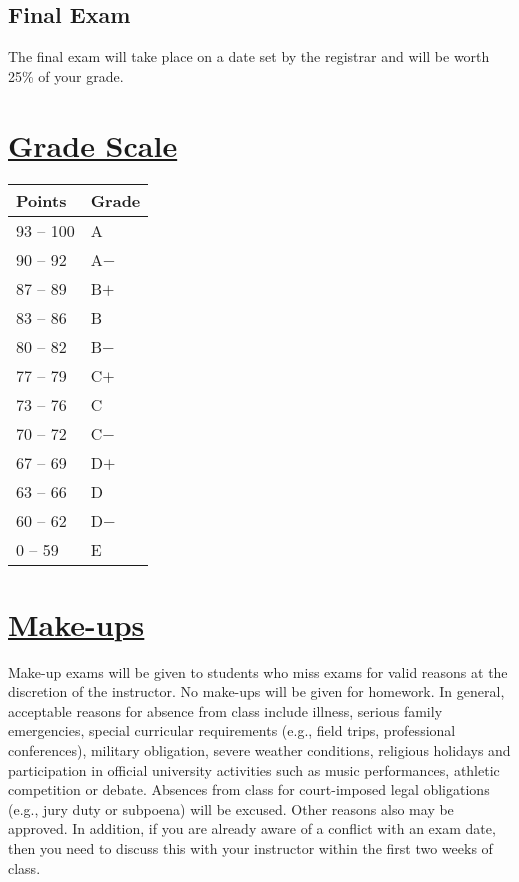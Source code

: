 \documentclass[11pt]{article}
\begin{document}
\subsection*{Final Exam}
The final exam will take place on a date set by the registrar and will be worth 25\% of your grade.
\section*{\underline{Grade Scale}}
\begin{center}
{\renewcommand{\arraystretch}{1.2}%
\begin{tabular}{|l|l|}
\hline
Points & Grade\\
\hline
93 -- 100  & A\\
90 -- 92 & A$-$\\
87 -- 89 & B$+$\\
83 -- 86 & B\\
80 -- 82 & B$-$\\
77 -- 79 &C$+$\\
73 -- 76 & C\\
70 -- 72& C$-$\\
67 -- 69& D$+$\\
63 -- 66& D\\
60 -- 62& D$-$\\
0 -- 59 & E\\
\hline
\end{tabular}}
\end{center}
\section*{\underline{Make-ups}}
Make-up exams will be given to students who miss exams for valid reasons at the discretion of the instructor. No make-ups will be given for homework. In general, acceptable reasons for absence from class include illness, serious family emergencies, special curricular requirements (e.g., field trips, professional conferences), military obligation, severe weather conditions, religious holidays and participation in official university activities such as music performances, athletic competition or debate. Absences from class for court-imposed legal obligations (e.g., jury duty or subpoena) will be excused. Other reasons also may be approved. In addition, if you are already aware of a conflict with an exam date, then you need to discuss this with your instructor within the first two weeks of class. 
\end{document}
